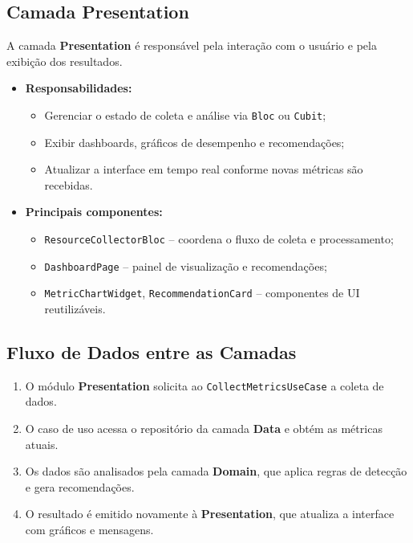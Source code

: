 \documentclass[12pt,a4paper,oneside]{abntex2}
\begin{document}
\subsection{Camada Presentation}

A camada \textbf{Presentation} é responsável pela interação com o usuário e pela exibição dos resultados.  

\begin{itemize}
  \item \textbf{Responsabilidades:}
    \begin{itemize}
      \item Gerenciar o estado de coleta e análise via \texttt{Bloc} ou \texttt{Cubit};
      \item Exibir dashboards, gráficos de desempenho e recomendações;
      \item Atualizar a interface em tempo real conforme novas métricas são recebidas.
    \end{itemize}
  \item \textbf{Principais componentes:}
    \begin{itemize}
      \item \texttt{ResourceCollectorBloc} – coordena o fluxo de coleta e processamento;
      \item \texttt{DashboardPage} – painel de visualização e recomendações;
      \item \texttt{MetricChartWidget}, \texttt{RecommendationCard} – componentes de UI reutilizáveis.
    \end{itemize}
\end{itemize}

\subsection{Fluxo de Dados entre as Camadas}

\begin{enumerate}
  \item O módulo \textbf{Presentation} solicita ao \texttt{CollectMetricsUseCase} a coleta de dados.
  \item O caso de uso acessa o repositório da camada \textbf{Data} e obtém as métricas atuais.
  \item Os dados são analisados pela camada \textbf{Domain}, que aplica regras de detecção e gera recomendações.
  \item O resultado é emitido novamente à \textbf{Presentation}, que atualiza a interface com gráficos e mensagens.
\end{enumerate}
\end{document}
